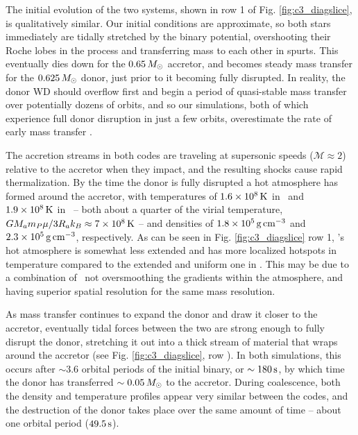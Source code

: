 The initial evolution of the two systems, shown in row 1 of Fig. \ref{fig:c3_diagslice}, is qualitatively similar.  Our initial conditions are approximate, so both stars immediately are tidally stretched by the binary potential, overshooting their Roche lobes in the process and transferring mass to each other in spurts.  This eventually dies down for the $0.65\,\Msun$ accretor, and becomes steady mass transfer for the $0.625\,\Msun$ donor, just prior to it becoming fully disrupted.  In reality, the donor WD should overflow first and begin a period of quasi-stable mass transfer over potentially dozens of orbits, and so our simulations, both of which experience full donor disruption in just a few orbits, overestimate the rate of early mass transfer \citep{dan+11}.


The accretion streams in both codes are traveling at supersonic speeds ($\mathcal{M} \approx 2$) relative to the accretor when they impact, and the resulting shocks cause rapid thermalization.  By the time the donor is fully disrupted a hot atmosphere has formed around the accretor, with temperatures of $1.6 \times 10^8\,\mathrm{K}$ in  \arepo\ and $1.9\times 10^8\,\mathrm{K}$ in \gasoline\ -- both about a quarter of the virial temperature, $GM_am_P\mu/3R_ak_B \approx 7 \times 10^8\,\mathrm{K}$ -- and densities of $1.8\times10^5\,\gcc$ and $2.3\times10^5\,\gcc$, respectively.  As can be seen in Fig. \ref{fig:c3_diagslice} row 1, \arepo's hot atmosphere is somewhat less extended and has more localized hotspots in temperature compared to the extended and uniform one in \gasoline.  This may be due to a combination of \arepo\ not oversmoothing the gradients within the atmosphere, and having superior spatial resolution for the same mass resolution.


As mass transfer continues to expand the donor and draw it closer to the accretor, eventually tidal forces between the two are strong enough to fully disrupt the donor, stretching it out into a thick stream of material that wraps around the accretor (see Fig. \ref{fig:c3_diagslice}, row {}).  In both simulations, this occurs after $\sim3.6$ orbital periods of the initial binary, or $\sim180\,\mathrm{s}$, by which time the donor has transferred $\sim0.05\,\Msun$ to the accretor.  During coalescence, both the density and temperature profiles appear very similar between the codes, and the destruction of the donor takes place over the same amount of time -- about one orbital period ($49.5\,\mathrm{s}$).

